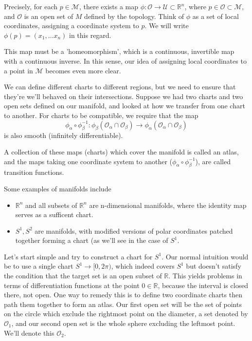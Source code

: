 \documentclass[11pt, a4paper]{article}   	%
\theoremstyle{slplain}
\begin{document}
Precisely, for each $p \in \mathcal{M}$, there exists a map $\phi : \mathcal{O} \rightarrow \mathcal{U} \subset \mathbb{R}^n$, where $p \in \mathcal{ O} \subset \mathcal{M}$, and $\mathcal{ O} $ is an open set of $M$ defined by the topology. Think of $\phi$ as a set of local coordinates, assigning a coordinate system to $ p$. We will write $\phi(p) = (x_1, \dots x_n) $ in this regard.   

This map must be a 'homeomorphism', which is a continuous, invertible map with a continuous inverse. In this sense, our idea of assigning local coordinates to a point in $\mathcal{M}$ becomes even more clear. 

We can define different charts to different regions, but we need to ensure that they're we'll behaved on their intersections. Suppose we had two charts and two open sets defined on our manifold, and looked at how we transfer from one chart to another. For charts to be compatible, we require that the map 
\[ 
\phi_\alpha \circ \phi_\beta^{ -1}: \phi_\beta ( \mathcal{ O}_\alpha \cap \mathcal{O}_\beta ) \rightarrow \phi_\alpha (\mathcal{ O}_\alpha \cap \mathcal{O}_\beta )
\] is also smooth (infinitely differentiable). 

A collection of these maps (charts) which cover the manifold is called an atlas, and the maps taking one coordinate system to another ($\phi_\alpha \circ \phi_\beta^{ -1} $), are called transition functions. 

Some examples of manifolds include 
\begin{itemize} 
\item $\mathbb{R}^n$ and all subsets of $\mathbb{R}^n$ are n-dimensional manifolds, where the identity map serves as a sufficent chart. 
\item $S^1, S^2$ are manifolds, with modified versions of polar coordinates patched together forming a chart (as we'll see in the case of $S^1$. 
\end{itemize}
Let's start simple and try to construct a chart for $S^1$. Our normal intuition would be to use a single chart $S^1 \rightarrow [0, 2 \pi) $, which indeed covers $S^1 $ but doesn't satisfy the condition that the target set is an open subset of $\mathbb{R}$. This yields problems in terms of differentiation functions at the point $0 \in \mathbb{R}$, because the interval is closed there, not open. One way to remedy this is to define two coordinate charts then path them together to form an atlas. Our first open set will be the set of points on the circle which exclude the rightmost point on the diameter, a set denoted by $\mathcal{O}_1$, and our second open set is the whole sphere excluding the leftmost point. We'll denote this $\mathcal{ O}_2 $. 
\end{document}
